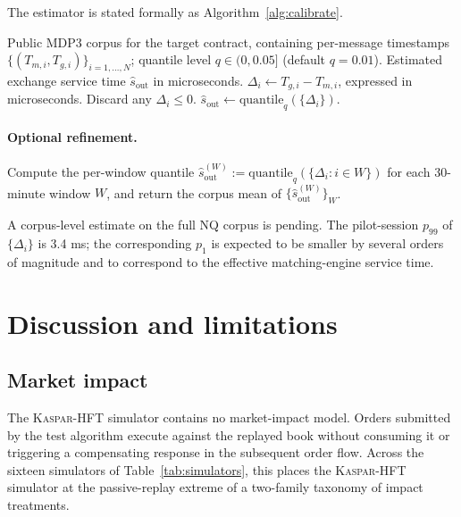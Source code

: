 \documentclass[11pt]{article}
\newcommand{\kasparhft}{\textsc{Kaspar-HFT}}
\begin{document}
The estimator is stated formally as Algorithm~\ref{alg:calibrate}.

\begin{algorithm}[htbp]
\caption{Exchange-service-time estimator from public MDP3.}
\label{alg:calibrate}
\begin{algorithmic}[1]
\Require Public MDP3 corpus for the target contract, containing per-message timestamps $\{(T_{m,i}, T_{g,i})\}_{i=1,\dots,N}$; quantile level $q \in (0, 0.05]$ (default $q = 0.01$).
\Ensure Estimated exchange service time $\hat{s}_{\mathrm{out}}$ in microseconds.
    \State $\Delta_i \gets T_{g,i} - T_{m,i}$, expressed in microseconds.
\EndFor
\State Discard any $\Delta_i \leq 0$.
\State \Return $\hat{s}_{\mathrm{out}} \gets \mathrm{quantile}_q(\{\Delta_i\})$.
\end{algorithmic}
\end{algorithm}

\paragraph{Optional refinement.} Compute the per-window quantile $\hat{s}_{\mathrm{out}}^{(W)} := \mathrm{quantile}_q(\{\Delta_i : i \in W\})$ for each 30-minute window $W$, and return the corpus mean of $\{\hat{s}_{\mathrm{out}}^{(W)}\}_W$.

A corpus-level estimate on the full NQ corpus is pending. The pilot-session $p_{99}$ of $\{\Delta_i\}$ is 3.4 ms; the corresponding $p_{1}$ is expected to be smaller by several orders of magnitude and to correspond to the effective matching-engine service time.

\section{Discussion and limitations}
\label{sec:discussion}

\subsection{Market impact}
\label{sec:discussion-impact}

The \kasparhft{} simulator contains no market-impact model. Orders submitted by the test algorithm execute against the replayed book without consuming it or triggering a compensating response in the subsequent order flow. Across the sixteen simulators of Table~\ref{tab:simulators}, this places the \kasparhft{} simulator at the passive-replay extreme of a two-family taxonomy of impact treatments.
\end{document}
